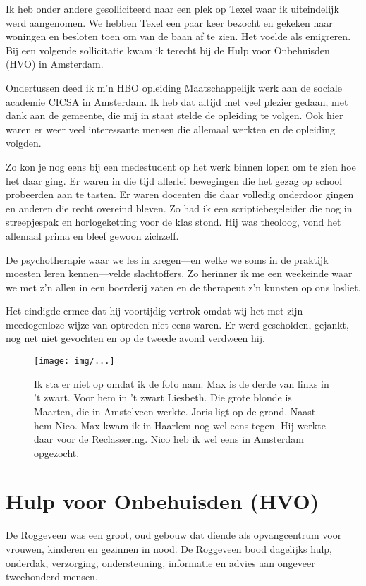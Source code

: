 \documentclass[10pt,twoside,openright]{memoir}
\begin{document}
Ik heb onder andere gesolliciteerd naar een plek op Texel waar ik uiteindelijk werd aangenomen. We hebben Texel een paar keer bezocht en gekeken naar woningen en besloten toen om van de baan af te zien. Het voelde als emigreren. Bij een volgende sollicitatie kwam ik terecht bij de Hulp voor Onbehuisden (HVO) in Amsterdam.

Ondertussen deed ik m’n HBO opleiding Maatschappelijk werk aan de sociale academie CICSA in Amsterdam. Ik heb dat altijd met veel plezier gedaan, met dank aan de gemeente, die mij in staat stelde de opleiding te volgen. Ook hier waren er weer veel interessante mensen die allemaal werkten en de opleiding volgden. 

Zo kon je nog eens bij een medestudent op het werk binnen lopen om te zien hoe het daar ging. Er waren in die tijd allerlei bewegingen die het gezag op school probeerden aan te tasten. Er waren docenten die daar volledig onderdoor gingen en anderen die recht overeind bleven. Zo had ik een scriptiebegeleider die nog in streepjespak en horlogeketting voor de klas stond. Hij was theoloog, vond het allemaal prima en bleef gewoon zichzelf. 

De psychotherapie waar we les in kregen---en welke we soms in de praktijk moesten leren kennen---velde slachtoffers. Zo herinner ik me een weekeinde waar we met z’n allen in een boerderij zaten en de therapeut z’n kunsten op ons losliet. 

Het eindigde ermee dat hij voortijdig vertrok omdat wij het met zijn meedogenloze wijze van optreden niet eens waren. Er werd gescholden, gejankt, nog net niet gevochten en op de tweede avond verdween hij.

\begin{figure}[t]
\texttt{[image: img/...]}
\caption{Ik sta er niet op omdat ik de foto nam. Max is de derde van links in ’t zwart. Voor hem in ’t zwart Liesbeth. Die grote blonde is Maarten, die in Amstelveen werkte. Joris ligt op de grond. Naast hem Nico. Max kwam ik in Haarlem nog wel eens tegen. Hij werkte daar voor de Reclassering. Nico heb ik wel eens in Amsterdam opgezocht.}
\end{figure}

\chapter{Hulp voor Onbehuisden (HVO)} %
\label{cha:hvo}

De Roggeveen was een groot, oud gebouw dat diende als opvangcentrum voor vrouwen, kinderen en gezinnen in nood. De Roggeveen bood dagelijks hulp, onderdak, verzorging, ondersteuning, informatie en advies aan ongeveer tweehonderd mensen.
\end{document}
